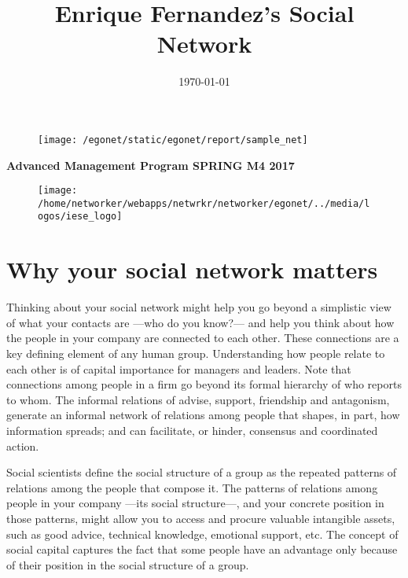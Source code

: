 \documentclass[a4paper,12pt]{article}
\title{\Huge{Enrique Fernandez's Social Network}}
\date{\today}
\begin{document}
\clearpage
\thispagestyle{empty}

\maketitle


\begin{figure}[H]
\centering
\texttt{[image: /egonet/static/egonet/report/sample\_net]}
\end{figure}


\begin{center}
\Large{\textbf{Advanced Management Program SPRING M4 2017}}


\begin{figure}[H]
\centering
\texttt{[image: /home/networker/webapps/netwrkr/networker/egonet/../media/logos/iese\_logo]}
\end{figure}

\small{}
\end{center}

\newpage
\clearpage
{}


\section*{Why your social network matters}


Thinking about your social network might help you go beyond a simplistic view of what your contacts are ---who do you know?--- and help you think about how the people in your company are connected to each other. These connections are a key defining element of any human group. Understanding how people relate to each other is of capital importance for managers and leaders. Note that connections among people in a firm go beyond its formal hierarchy of who reports to whom. The informal relations of advise, support, friendship and antagonism, generate an informal network of relations among people that shapes, in part, how information spreads; and can facilitate, or hinder, consensus and coordinated action.

Social scientists define the social structure of a group as the repeated patterns of relations among the people that compose it. The patterns of relations among people in your company ---its social structure---, and your concrete position in those patterns, might allow you to access and procure valuable intangible assets, such as good advice, technical knowledge, emotional support, etc. The concept of social capital captures the fact that some people have an advantage only because of their position in the social structure of a group.
\end{document}
